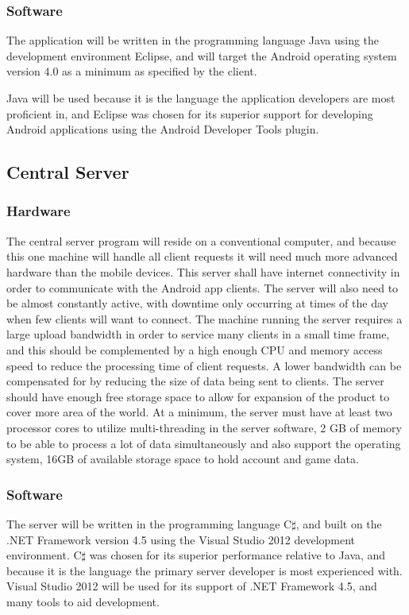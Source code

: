 		\subsubsection{Software}
			The application will be written in the programming language Java 
			using the development environment Eclipse, and will target the 
			Android operating system version 4.0 as a minimum as specified by 
			the client.

			Java will be used because it is the language the application 
			developers are most proficient in, and Eclipse was chosen for its 
			superior support for developing Android applications using the
			Android Developer Tools plugin.
	\subsection{Central Server}
		\subsubsection{Hardware}
			The central server program will reside on a conventional computer, 
			and because this one machine will handle all client requests it 
			will need much more advanced hardware than the mobile devices. 
			This server shall have internet connectivity in order to 
			communicate with the Android app clients. The server will also 
			need to be almost constantly active, with downtime only occurring 
			at times of the day when few clients will want to connect. The 
			machine running the server requires a large upload bandwidth in 
			order to service many clients in a small time frame, and this 
			should be complemented by a high enough CPU and memory access 
			speed to reduce the processing time of client requests. A lower 
			bandwidth can be compensated for by reducing the size of data 
			being sent to clients. The server should have enough free storage 
			space to allow for expansion of the product to cover more area of 
			the world. At a minimum, the server must have at least two
			processor cores to utilize multi-threading in the server software,
			2 GB of memory to be able to process a lot of data simultaneously 
			and also support the operating system, 16GB of available storage
			space to hold account and game data.

		\subsubsection{Software}
			The server will be written in the programming language C$\sharp$, 
			and built on the .NET Framework version 4.5 using the Visual 
			Studio 2012 development environment. C$\sharp$ was chosen for its 
			superior performance relative to Java, and because it is the 
			language the primary server developer is most experienced with.
			Visual Studio 2012 will be used for its support of .NET Framework
			4.5, and many tools to aid development.

